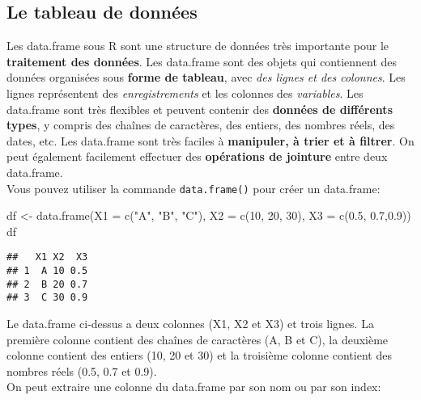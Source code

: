 \documentclass[
]{article}
\newenvironment{Shaded}{\begin{snugshade}}{\end{snugshade}}
\newcommand{\AttributeTok}[1]{\textcolor[rgb]{0.77,0.63,0.00}{#1}}
\newcommand{\DecValTok}[1]{\textcolor[rgb]{0.00,0.00,0.81}{#1}}
\newcommand{\FloatTok}[1]{\textcolor[rgb]{0.00,0.00,0.81}{#1}}
\newcommand{\FunctionTok}[1]{\textcolor[rgb]{0.00,0.00,0.00}{#1}}
\newcommand{\NormalTok}[1]{#1}
\newcommand{\OtherTok}[1]{\textcolor[rgb]{0.56,0.35,0.01}{#1}}
\newcommand{\StringTok}[1]{\textcolor[rgb]{0.31,0.60,0.02}{#1}}
\begin{document}
\hypertarget{le-tableau-de-donnuxe9es}{%
\subsection{Le tableau de données}\label{le-tableau-de-donnuxe9es}}

Les data.frame sous R sont une structure de données très importante pour le \textbf{traitement des données}. Les data.frame sont des objets qui contiennent des données organisées sous \textbf{forme de tableau}, avec \emph{des lignes et des colonnes}. Les lignes représentent des \emph{enregistrements} et les colonnes des \emph{variables}. Les data.frame sont très flexibles et peuvent contenir des \textbf{données de différents types}, y compris des chaînes de caractères, des entiers, des nombres réels, des dates, etc. Les data.frame sont très faciles à \textbf{manipuler, à trier et à filtrer}. On peut également facilement effectuer des \textbf{opérations de jointure} entre deux data.frame.\\
Vous pouvez utiliser la commande \texttt{data.frame()} pour créer un data.frame:

\begin{Shaded}
\begin{Highlighting}[]
\NormalTok{df }\OtherTok{\textless{}{-}} \FunctionTok{data.frame}\NormalTok{(}\AttributeTok{X1 =} \FunctionTok{c}\NormalTok{(}\StringTok{"A"}\NormalTok{, }\StringTok{"B"}\NormalTok{, }\StringTok{"C"}\NormalTok{),}
                 \AttributeTok{X2 =} \FunctionTok{c}\NormalTok{(}\DecValTok{10}\NormalTok{, }\DecValTok{20}\NormalTok{, }\DecValTok{30}\NormalTok{),}
                 \AttributeTok{X3 =} \FunctionTok{c}\NormalTok{(}\FloatTok{0.5}\NormalTok{, }\FloatTok{0.7}\NormalTok{,}\FloatTok{0.9}\NormalTok{))}
\NormalTok{df}
\end{Highlighting}
\end{Shaded}

\begin{verbatim}
##   X1 X2  X3
## 1  A 10 0.5
## 2  B 20 0.7
## 3  C 30 0.9
\end{verbatim}

Le data.frame ci-dessus a deux colonnes (X1, X2 et X3) et trois lignes. La première colonne contient des chaînes de caractères (A, B et C), la deuxième colonne contient des entiers (10, 20 et 30) et la troisième colonne contient des nombres réels (0.5, 0.7 et 0.9).\\
On peut extraire une colonne du data.frame par son nom ou par son index:
\end{document}
